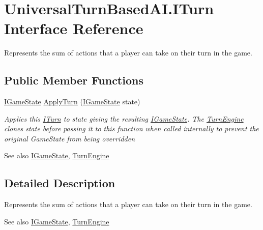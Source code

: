 \hypertarget{interface_universal_turn_based_a_i_1_1_i_turn}{}\section{Universal\+Turn\+Based\+A\+I.\+I\+Turn Interface Reference}
\label{interface_universal_turn_based_a_i_1_1_i_turn}


Represents the sum of actions that a player can take on their turn in the game.  


\subsection*{Public Member Functions}
\begin{DoxyCompactItemize}
\item 
\hyperlink{interface_universal_turn_based_a_i_1_1_i_game_state}{I\+Game\+State} \hyperlink{interface_universal_turn_based_a_i_1_1_i_turn_a1df5a4802be8dfbed323a6ef94133ff8}{Apply\+Turn} (\hyperlink{interface_universal_turn_based_a_i_1_1_i_game_state}{I\+Game\+State} state)
\begin{DoxyCompactList}\small\item\em Applies this \hyperlink{interface_universal_turn_based_a_i_1_1_i_turn}{I\+Turn} to {\itshape state}  giving the resulting \hyperlink{interface_universal_turn_based_a_i_1_1_i_game_state}{I\+Game\+State}. The \hyperlink{class_universal_turn_based_a_i_1_1_turn_engine}{Turn\+Engine} clones {\itshape state}  before passing it to this function when called internally to prevent the original Game\+State from being overridden \begin{DoxySeeAlso}{See also}
\hyperlink{interface_universal_turn_based_a_i_1_1_i_game_state}{I\+Game\+State}, \hyperlink{class_universal_turn_based_a_i_1_1_turn_engine}{Turn\+Engine}


\end{DoxySeeAlso}
\end{DoxyCompactList}\end{DoxyCompactItemize}


\subsection{Detailed Description}
Represents the sum of actions that a player can take on their turn in the game. 

\begin{DoxySeeAlso}{See also}
\hyperlink{interface_universal_turn_based_a_i_1_1_i_game_state}{I\+Game\+State}, \hyperlink{class_universal_turn_based_a_i_1_1_turn_engine}{Turn\+Engine}


\end{DoxySeeAlso}


